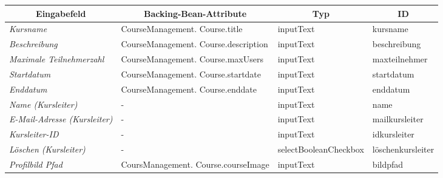\begin{itemize}
\begin{center}
\begin{longtable}{|p{3cm} |p{5cm} | p{4cm}|p{3cm}|}
						\hline \multicolumn{1}{|c|}{\textbf{Eingabefeld}} & \multicolumn{1}{|c|}{\textbf{Backing-Bean-Attribute}} & \multicolumn{1}{|c|}{\textbf{Typ}}  &  \multicolumn{1}{|c|}{\textbf{ID}} \\ \hline
						\endfirsthead
						\hline
						\endlastfoot
						\textit{Kursname} & CourseManagement. Course.title & inputText & kursname \\ \hline
						\textit{Beschreibung} & CourseManagement. Course.description & inputText & beschreibung \\ \hline
						\textit{Maximale Teilnehmerzahl} & CourseManagement. Course.maxUsers & inputText & maxteilnehmer \\ \hline
						\textit{Startdatum} & CourseManagement. Course.startdate & inputText & startdatum \\ \hline
						\textit{Enddatum} & CourseManagement. Course.enddate & inputText & enddatum \\ \hline
						\textit{Name (Kursleiter)} & - & inputText & name \\ \hline
						\textit{E-Mail-Adresse (Kursleiter)} & - & inputText & mailkursleiter \\ \hline
						\textit{Kursleiter-ID} & - & inputText & idkursleiter \\ \hline
						\textit{Löschen (Kursleiter)} & - & selectBooleanCheckbox & löschenkursleiter \\ \hline
						\textit{Profilbild Pfad} & CoursManagement. Course.courseImage & inputText & bildpfad \\ \hline
					\end{longtable}
				\end{center}
				
				\begin{center}
					\begin{longtable}{|p{3cm} |p{8cm} | p{5cm}|}
						

\end{longtable}
\end{center}
\end{itemize}

